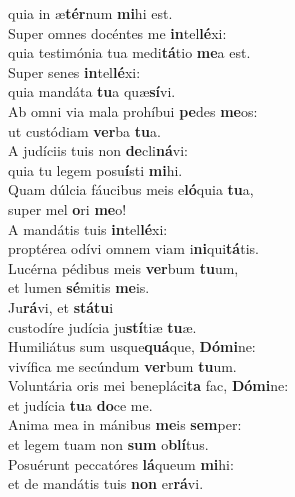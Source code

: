 \evenverse quia in æ\textbf{tér}num \textbf{mi}hi est.\\
\oddverse Super omnes docéntes me \textbf{in}tel\textbf{lé}xi:~\*\\
\oddverse quia testimónia tua medi\textbf{tá}tio \textbf{me}a est.\\
\evenverse Super senes \textbf{in}tel\textbf{lé}xi:~\*\\
\evenverse quia mandáta \textbf{tu}a quæ\textbf{sí}vi.\\
\oddverse Ab omni via mala prohíbui \textbf{pe}des \textbf{me}os:~\*\\
\oddverse ut custódiam \textbf{ver}ba \textbf{tu}a.\\
\evenverse A judíciis tuis non \textbf{de}cli\textbf{ná}vi:~\*\\
\evenverse quia tu legem posu\textbf{í}sti \textbf{mi}hi.\\
\oddverse Quam dúlcia fáucibus meis e\textbf{ló}quia \textbf{tu}a,~\*\\
\oddverse super mel \textbf{o}ri \textbf{me}o!\\
\evenverse A mandátis tuis \textbf{in}tel\textbf{lé}xi:~\*\\
\evenverse proptérea odívi omnem viam i\textbf{ni}qui\textbf{tá}tis.\\
\oddverse Lucérna pédibus meis \textbf{ver}bum \textbf{tu}um,~\*\\
\oddverse et lumen \textbf{sé}mitis \textbf{me}is.\\
\evenverse Ju\textbf{rá}vi, et \textbf{stá}\textbf{tu}i~\*\\
\evenverse custodíre judícia ju\textbf{stí}tiæ \textbf{tu}æ.\\
\oddverse Humiliátus sum usque\textbf{quá}que, \textbf{Dó}\textbf{mi}ne:~\*\\
\oddverse vivífica me secúndum \textbf{ver}bum \textbf{tu}um.\\
\evenverse Voluntária oris mei benepláci\textbf{ta} fac, \textbf{Dó}\textbf{mi}ne:~\*\\
\evenverse et judícia \textbf{tu}a \textbf{do}ce me.\\
\oddverse Anima mea in mánibus \textbf{me}is \textbf{sem}per:~\*\\
\oddverse et legem tuam non \textbf{sum} o\textbf{blí}tus.\\
\evenverse Posuérunt peccatóres \textbf{lá}queum \textbf{mi}hi:~\*\\
\evenverse et de mandátis tuis \textbf{non} er\textbf{rá}vi.\\
